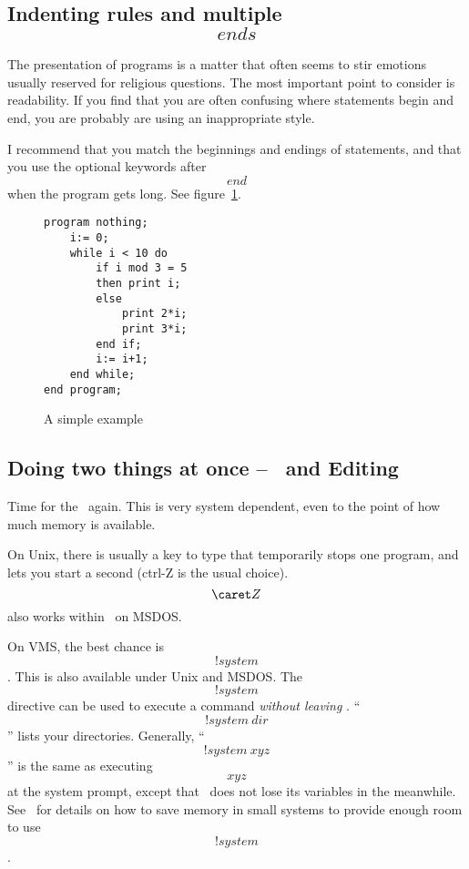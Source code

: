 \subsection{Indenting rules and multiple \[ends\]}
The presentation of programs is a matter that often seems to stir
emotions usually reserved for religious questions.  The most important
point to consider is readability.  If you find that you are often
confusing where statements begin and end, you are probably are using an
inappropriate style.

I recommend that you match the beginnings and endings of statements,
and that you use the optional keywords after \[end\] when the program
gets long.  See figure~\ref{ex:indent}.

\begin{figure}[hbt]\begin{verbatim}
program nothing;
    i:= 0;
    while i < 10 do
        if i mod 3 = 5
        then print i;
        else
            print 2*i;
            print 3*i;
        end if;
        i:= i+1;
    end while;
end program;
\end{verbatim}
\caption{A simple example\label{ex:indent}}
\end{figure}

\subsection{Doing two things at once -- \ISETL\ and Editing}\label{system}
Time for the \GURU\ again.
This is very system dependent, even to the point of how much memory is
available.  

On Unix, there is usually a key to type that temporarily
stops one program, and lets you start a second (ctrl-Z is the usual choice).
\[\caret Z\] also works within \ISETL\ on MSDOS.

On VMS, the best chance is \[!system\].  This is also available
under Unix and MSDOS.
The \[!system\] directive can be used to execute a command
{\em without leaving \ISETL}\@.  ``\[!system~dir\]'' lists your
directories.   Generally, 
``\[!system~xyz\]'' is the same as executing \[xyz\] at the system prompt,
except that \ISETL\ does not lose its variables in the meanwhile.
See \Intro\ for details on how to save memory in small systems to provide
enough room to use \[!system\].


